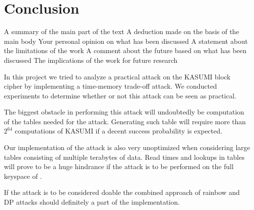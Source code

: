 \chapter{Conclusion}
\label{ch:concl}
A summary of the main part of the text
A deduction made on the basis of the main body
Your personal opinion on what has been discussed
A statement about the limitations of the work
A comment about the future based on what has been discussed
The implications of the work for future research

In this project we tried to analyze a practical attack on the KASUMI
block cipher by implementing a time-memory trade-off attack. We
conducted experiments to determine whether or not this attack can be
seen as practical. 

The biggest obstacle in performing this attack will undoubtedly be
computation of the tables needed for the attack. Generating such table
will require more than $2^{64}$ computations of KASUMI if a decent
success probability is expected.

Our implementation of the attack is also very unoptimized when
considering large tables consisting of multiple terabytes of
data. Read times and lookups in tables will prove to be a huge
hindrance if the attack is to be performed on the full keyspace of
.

If the attack is to be considered doable the combined approach of 
rainbow and DP attacks should definitely a part of the
implementation. 

